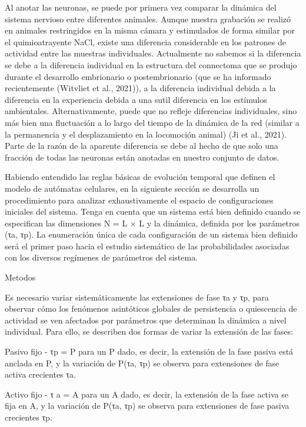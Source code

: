 Al anotar las neuronas, se puede por primera vez comparar la dinámica del sistema nervioso entre diferentes animales. Aunque nuestra grabación se realizó en animales restringidos en la misma cámara y estimulados de forma similar por el quimioatrayente NaCl, existe una diferencia considerable en los patrones de actividad entre las muestras individuales. Actualmente no sabemos si la diferencia se debe a la diferencia individual en la estructura del connectoma que se produjo durante el desarrollo embrionario o postembrionario (que se ha informado recientemente (Witvliet et al., 2021)), a la diferencia individual debida a la diferencia en la experiencia debida a una sutil diferencia en los estímulos ambientales. Alternativamente, puede que no refleje diferencias individuales, sino más bien una fluctuación a lo largo del tiempo de la dinámica de la red (similar a la permanencia y el desplazamiento en la locomoción animal) (Ji et al., 2021). Parte de la razón de la aparente diferencia se debe al hecho de que solo una fracción de todas las neuronas están anotadas en nuestro conjunto de datos.




Habiendo entendido las reglas básicas de evolución temporal que definen el modelo de autómatas celulares, en la siguiente sección se desarrolla un procedimiento para analizar exhaustivamente el espacio de configuraciones iniciales del sistema. Tenga en cuenta que un sistema está bien definido cuando se especifican las dimensiones N = L × L y la dinámica, definida por los parámetros (τa, τp). La enumeración única de cada configuración de un sistema bien definido será el primer paso hacia el estudio sistemático de las probabilidades asociadas con los diversos regímenes de parámetros del sistema.

Metodos

Es necesario variar sistemáticamente las extensiones de fase τa y τp, para observar cómo los fenómenos asintóticos globales de persistencia o quiescencia de actividad se ven afectados por parámetros que determinan la dinámica a nivel individual. Para ello, se describen dos formas de variar la extensión de las fases:

Pasivo fijo - τp = P para un P dado, es decir, la extensión de la fase pasiva está anclada en P, y la variación de P(τa, τp) se observa para extensiones de fase activa crecientes τa.

Activo fijo - τ a = A para un A dado, es decir, la extensión de la fase activa se fija en A, y la variación de P(τa, τp) se observa para extensiones de fase pasiva crecientes τp.



